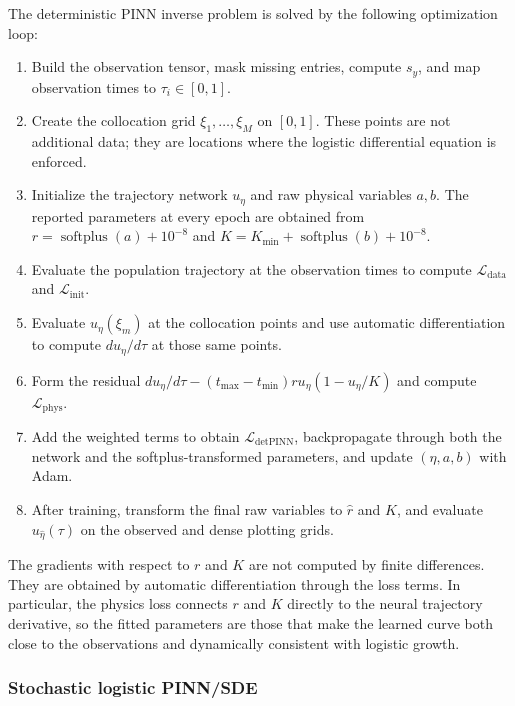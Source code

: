 \documentclass[11pt]{article}
\begin{document}
The deterministic PINN inverse problem is solved by the following optimization
loop:
\begin{enumerate}
  \item Build the observation tensor, mask missing entries, compute $s_y$, and
        map observation times to $\tau_i\in[0,1]$.
  \item Create the collocation grid
        $\xi_1,\ldots,\xi_M$ on $[0,1]$. These points are not additional data;
        they are locations where the logistic differential equation is
        enforced.
  \item Initialize the trajectory network $u_\eta$ and raw physical variables
        $a,b$. The reported parameters at every epoch are obtained from
        $r=\operatorname{softplus}(a)+10^{-8}$ and
        $K=K_{\min}+\operatorname{softplus}(b)+10^{-8}$.
  \item Evaluate the population trajectory at the observation times to compute
        $\mathcal L_{\mathrm{data}}$ and $\mathcal L_{\mathrm{init}}$.
  \item Evaluate $u_\eta(\xi_m)$ at the collocation points and use automatic
        differentiation to compute $du_\eta/d\tau$ at those same points.
  \item Form the residual
        $du_\eta/d\tau-(t_{\max}-t_{\min})r u_\eta(1-u_\eta/K)$ and compute
        $\mathcal L_{\mathrm{phys}}$.
  \item Add the weighted terms to obtain
        $\mathcal L_{\mathrm{detPINN}}$, backpropagate through both the
        network and the softplus-transformed parameters, and update
        $(\eta,a,b)$ with Adam.
  \item After training, transform the final raw variables to
        $\widehat r$ and $\widehat K$, and evaluate $u_{\widehat\eta}(\tau)$
        on the observed and dense plotting grids.
\end{enumerate}

The gradients with respect to $r$ and $K$ are not computed by finite
differences. They are obtained by automatic differentiation through the loss
terms. In particular, the physics loss connects $r$ and $K$ directly to the
neural trajectory derivative, so the fitted parameters are those that make the
learned curve both close to the observations and dynamically consistent with
logistic growth.

\subsubsection{Stochastic logistic PINN/SDE}
\end{document}
